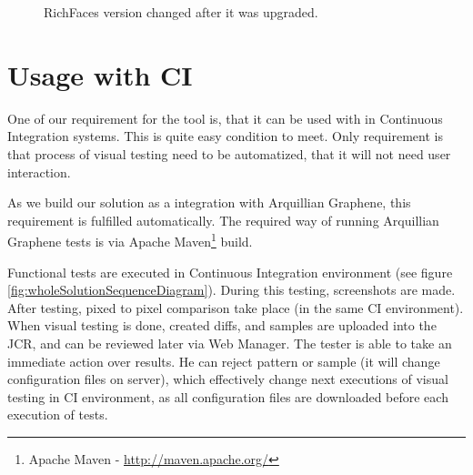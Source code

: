 \documentclass[11pt,oneside,final]{fithesis2}
\begin{document}
  \begin{figure}[!htb]
      \begin{center}
      \leavevmode
      \centerline{}
      \end{center}
      \caption{RichFaces version changed after it was upgraded.}
      \label{fig:rfVersionChanged}
  \end{figure}

  \section{Usage with CI}
  One of our requirement for the tool is, that it can be used with in Continuous Integration systems. This is quite easy condition to meet.
  Only requirement is that process of visual testing need to be automatized, that it will not need user interaction.
  
  As we build our solution as a integration with Arquillian Graphene, this requirement is fulfilled automatically. The required way of running
  Arquillian Graphene tests is via Apache Maven\footnote{Apache Maven - \url{http://maven.apache.org/}} build.
  
  Functional tests are executed in Continuous Integration environment (see figure \ref{fig:wholeSolutionSequenceDiagram}). During this testing,
  screenshots are made. After testing, pixed to pixel comparison take place (in the same CI environment). When visual testing is done, created
  diffs, and samples are uploaded into the JCR, and can be reviewed later via Web Manager. The tester is able to take an immediate action
  over results. He can reject pattern or sample (it will change configuration files on server), which effectively change next executions of 
  visual testing in CI environment, as all configuration files are downloaded before each execution of tests.
  
\end{document}
